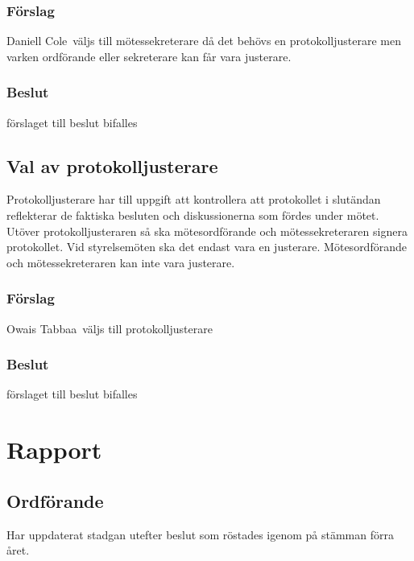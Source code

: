 \documentclass[protokoll]{dvd}
\def\ordf{Daniell Cole}
\def\kassa{Owais Tabbaa}
\begin{document}
\subsubsection*{Förslag}
\begin{attsatser}
    \item \ordf\ väljs till mötessekreterare då det behövs en protokolljusterare men varken ordförande eller sekreterare kan får vara justerare.
\end{attsatser}
\subsubsection*{Beslut}
\begin{attsatser}
    \item förslaget till beslut bifalles
\end{attsatser}

\subsection{Val av protokolljusterare}

Protokolljusterare har till uppgift att kontrollera att protokollet i slutändan reflekterar de faktiska besluten och diskussionerna som fördes under mötet.
Utöver protokolljusteraren så ska mötesordförande och mötessekreteraren signera protokollet.
Vid styrelsemöten ska det endast vara en justerare.
Mötesordförande och mötessekreteraren kan inte vara justerare.

\subsubsection*{Förslag}
\begin{attsatser}
    \item \kassa\ väljs till protokolljusterare
\end{attsatser}
\subsubsection*{Beslut}
\begin{attsatser}
    \item förslaget till beslut bifalles
\end{attsatser}

\section{Rapport} 
\subsection{Ordförande}
Har uppdaterat stadgan utefter beslut som röstades igenom på stämman förra året.
\end{document}
